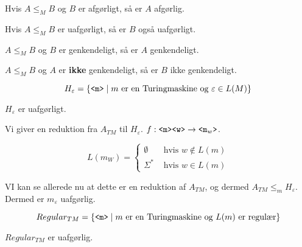 \begin{theorem}
	Hvis $A \leq _{M}B$ og $B$ er afgørligt, så er $A$ afgørlig.
\end{theorem}

\begin{corollary}
	Hvis $A \leq _{M}B$ er uafgørligt, så er $B$ også uafgørligt.
\end{corollary}

\begin{theorem}
	$A \leq_{M} B$ og $B$ er genkendeligt, så er $A$ genkendeligt.
\end{theorem}

\begin{corollary}
	$A \leq_M B$ og $A$ er \textbf{ikke} genkendeligt, så er $B$ ikke genkendeligt.
\end{corollary}

\begin{equation*}
	H_{\varepsilon} = \{\text{\texttt{<m>}} \mid m \text{ er en Turingmaskine og } \varepsilon \in L(M)\}
\end{equation*}

\begin{theorem}
	$H_{\varepsilon}$ er uafgørligt.
\end{theorem}

\begin{theorem}
	Vi giver en reduktion fra $A_{TM}$ til $H_{\varepsilon}$. $f : \text{\texttt{<m><w>}} \rightarrow \text{\texttt{<m$_{w}$>}}$.

	\begin{equation*}
		L(m_{W}) = \begin{cases}
			\emptyset  & \text{ hvis } w \notin L(m) \\
			\Sigma^{*} & \text{ hvis } w \in L(m)
		\end{cases}
	\end{equation*}

	VI kan se allerede nu at dette er en reduktion af $A_{TM}$, og dermed $A_{TM} \leq_{m} H_{\varepsilon}$. Dermed er $m_{\varepsilon}$ uafgørlig.
\end{theorem}

\begin{equation*}
	Regular_{TM} = \{\text{\texttt{<m>}} \mid m \text{ er en Turingmaskine og }L(m) \text{ er regulær}\}
\end{equation*}

\begin{theorem}
	$Regular_{TM}$ er uafgørlig.
\end{theorem}

